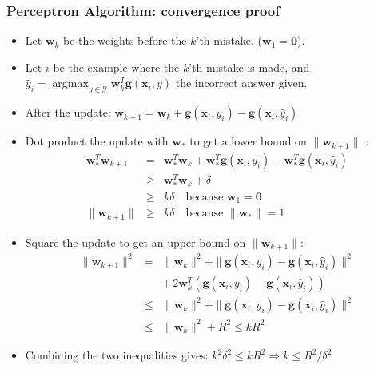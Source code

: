 \documentclass[ignorenonframetext,plain]{beamer}
\DeclareMathOperator*{\argmax}{argmax}
\renewcommand{\vec}{\mathbf}
\begin{document}
\begin{frame}\frametitle{Perceptron Algorithm: convergence proof}
\small
\begin{itemize}
\item Let $\vec{w}_k$ be the weights before the $k$'th mistake.
  ($\vec{w}_1 = \vec{0}$).
\item Let $i$ be the example where the $k$'th mistake is made, and
  $\hat{y}_i = \argmax_{y\in\mathcal{Y}} \vec{w}_k^T \vec{g}(\vec{x}_i,y)$
  the incorrect answer given.
\item After the update: $\vec{w}_{k+1} = \vec{w}_k + \vec{g}(\vec{x}_i,y_i) -
  \vec{g}(\vec{x}_i,\hat{y}_i)$
\item Dot product the update with $\vec{w}_*$ to get a lower bound on
  $\|\vec{w}_{k+1}\|$ :\begin{eqnarray*} 
\vec{w}_*^T \vec{w}_{k+1} &=& \vec{w}_*^T \vec{w}_k + \vec{w}_*^T
  \vec{g}(\vec{x}_i,y_i) - \vec{w}_*^T \vec{g}(\vec{x}_i,\hat{y}_i) \\
 &\geq& \vec{w}_*^T \vec{w}_k + \delta \\
 &\geq& k \delta 
  \quad\text{because } \vec{w}_1=\vec{0} \\
\|\vec{w}_{k+1}\| &\geq& k \delta 
  \quad\text{because } \|\vec{w}_*\|=1
\end{eqnarray*} 
\item Square the update to get an upper bound on
  $\|\vec{w}_{k+1}\|$: \begin{eqnarray*}
\|\vec{w}_{k+1}\|^2 &=& \|\vec{w}_k\|^2 + \|\vec{g}(\vec{x}_i,y_i) -
  \vec{g}(\vec{x}_i,\hat{y}_i)\|^2 \\
  && +\, 2 \vec{w}_k^T (\vec{g}(\vec{x}_i,y_i) -
  \vec{g}(\vec{x}_i,\hat{y}_i)) \\
&\leq& \|\vec{w}_k\|^2 + \|\vec{g}(\vec{x}_i,y_i) -
  \vec{g}(\vec{x}_i,\hat{y}_i)\|^2 \\
&\leq& \|\vec{w}_k\|^2 + R^2 \leq k R^2
\end{eqnarray*}
\item Combining the two inequalities gives: $ k^2 \delta^2 \leq k R^2
  \Rightarrow k \leq R^2 / \delta^2 $
\end{itemize}
\end{frame}
\end{document}
